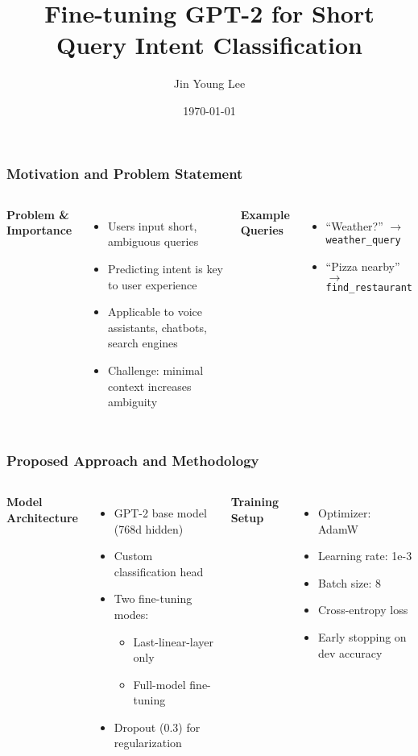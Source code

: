 \documentclass{beamer}
\title{Fine-tuning GPT-2 for Short Query Intent Classification}
\author{Jin Young Lee}
\date{\today}
\begin{document}
\begin{frame}
\titlepage
\end{frame}

\begin{frame}
\frametitle{Motivation and Problem Statement}
\begin{columns}
  \textbf{Problem \& Importance}
  \begin{itemize}
    \item Users input short, ambiguous queries
    \item Predicting intent is key to user experience
    \item Applicable to voice assistants, chatbots, search engines
    \item Challenge: minimal context increases ambiguity
  \end{itemize}

  \textbf{Example Queries}
  \begin{itemize}
    \item ``Weather?'' $\rightarrow$ \texttt{weather\_query}
    \item ``Pizza nearby'' $\rightarrow$ \texttt{find\_restaurant}
  \end{itemize}
\end{columns}
\end{frame}

\begin{frame}
\frametitle{Proposed Approach and Methodology}
\begin{columns}
  \textbf{Model Architecture}
  \begin{itemize}
    \item GPT-2 base model (768d hidden)
    \item Custom classification head
    \item Two fine-tuning modes:
    \begin{itemize}
      \item Last-linear-layer only
      \item Full-model fine-tuning
    \end{itemize}
    \item Dropout (0.3) for regularization
  \end{itemize}

  \textbf{Training Setup}
  \begin{itemize}
    \item Optimizer: AdamW
    \item Learning rate: 1e-3
    \item Batch size: 8
    \item Cross-entropy loss
    \item Early stopping on dev accuracy
  \end{itemize}
\end{columns}
\end{frame}
\end{document}
